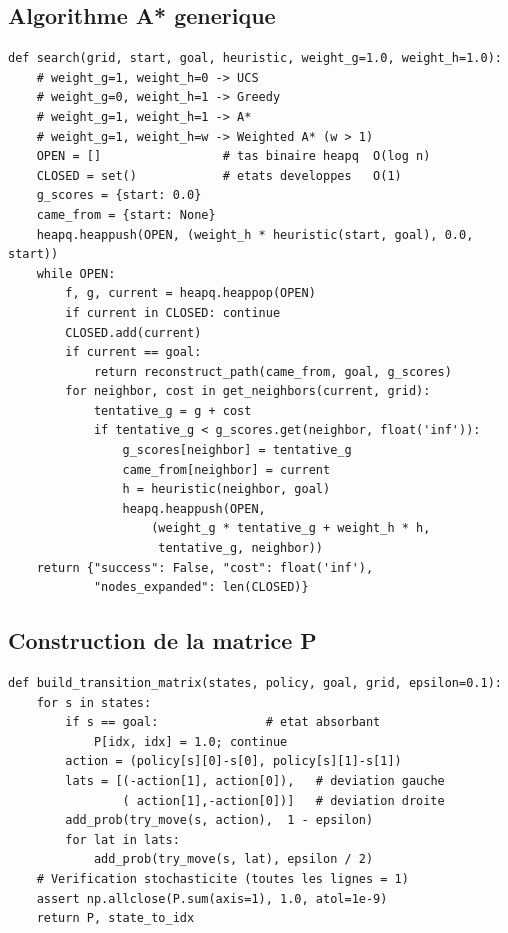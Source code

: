 \documentclass[11pt,a4paper]{article}
\begin{document}
\subsection{Algorithme A* generique}

\begin{lstlisting}[style=py, caption={astar.py --- search() unifiant UCS / Greedy / A* / Weighted A*}]
def search(grid, start, goal, heuristic, weight_g=1.0, weight_h=1.0):
    # weight_g=1, weight_h=0 -> UCS
    # weight_g=0, weight_h=1 -> Greedy
    # weight_g=1, weight_h=1 -> A*
    # weight_g=1, weight_h=w -> Weighted A* (w > 1)
    OPEN = []                 # tas binaire heapq  O(log n)
    CLOSED = set()            # etats developpes   O(1)
    g_scores = {start: 0.0}
    came_from = {start: None}
    heapq.heappush(OPEN, (weight_h * heuristic(start, goal), 0.0, start))
    while OPEN:
        f, g, current = heapq.heappop(OPEN)
        if current in CLOSED: continue
        CLOSED.add(current)
        if current == goal:
            return reconstruct_path(came_from, goal, g_scores)
        for neighbor, cost in get_neighbors(current, grid):
            tentative_g = g + cost
            if tentative_g < g_scores.get(neighbor, float('inf')):
                g_scores[neighbor] = tentative_g
                came_from[neighbor] = current
                h = heuristic(neighbor, goal)
                heapq.heappush(OPEN,
                    (weight_g * tentative_g + weight_h * h,
                     tentative_g, neighbor))
    return {"success": False, "cost": float('inf'),
            "nodes_expanded": len(CLOSED)}
\end{lstlisting}

\subsection{Construction de la matrice P}

\begin{lstlisting}[style=py, caption={markov.py --- construction et verification de P stochastique}]
def build_transition_matrix(states, policy, goal, grid, epsilon=0.1):
    for s in states:
        if s == goal:               # etat absorbant
            P[idx, idx] = 1.0; continue
        action = (policy[s][0]-s[0], policy[s][1]-s[1])
        lats = [(-action[1], action[0]),   # deviation gauche
                ( action[1],-action[0])]   # deviation droite
        add_prob(try_move(s, action),  1 - epsilon)
        for lat in lats:
            add_prob(try_move(s, lat), epsilon / 2)
    # Verification stochasticite (toutes les lignes = 1)
    assert np.allclose(P.sum(axis=1), 1.0, atol=1e-9)
    return P, state_to_idx
\end{lstlisting}
\end{document}
